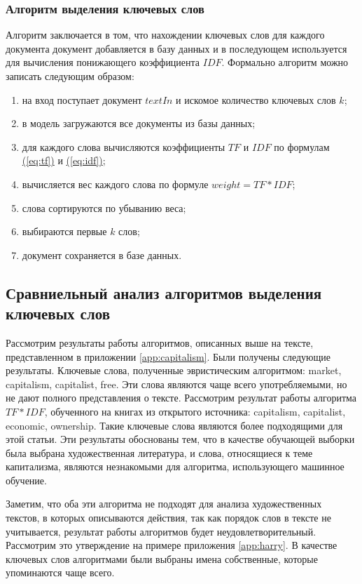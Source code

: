 \subsubsection{Алгоритм выделения ключевых слов}

Алгоритм заключается в том, что нахождении ключевых слов для каждого документа документ добавляется в базу данных и в последующем используется для вычисления понижающего коэффициента $IDF$. Формально алгоритм можно записать следующим образом:
\begin{enumerate}
\item на вход поступает документ $textIn$ и искомое количество ключевых слов $k$;
\item в модель загружаются все документы из базы данных;
\item для каждого слова вычисляются коэффициенты $TF$ и $IDF$ по формулам \hyperref[eq:tf]{(\ref{eq:tf})} и \hyperref[eq:idf]{(\ref{eq:idf})};
\item вычисляется вес каждого слова по формуле $weight = TF*IDF$;
\item слова сортируются по убыванию веса;
\item выбираются первые $k$ слов;
\item документ сохраняется в базе данных.
\end{enumerate}

\subsection{Сравниельный анализ алгоритмов выделения ключевых слов}

Рассмотрим результаты работы алгоритмов, описанных выше на тексте, представленном в приложении \hyperref[app:capitalism]{\ref{app:capitalism}}. Были получены следующие результаты. Ключевые слова, полученные эвристическим алгоритмом: market, capitalism, capitalist, free. Эти слова являются чаще всего употребляемыми, но не дают полного представления о тексте. Рассмотрим результат работы алгоритма $TF*IDF$, обученного на книгах из открытого источника: capitalism, capitalist, economic, ownership. Такие ключевые слова являются более подходящими для этой статьи. Эти результаты обоснованы тем, что в качестве обучающей выборки была выбрана художественная литература, и слова, относящиеся к теме капитализма, являются незнакомыми для алгоритма, использующего машинное обучение.

Заметим, что оба эти алгоритма не подходят для анализа художественных текстов, в которых описываются действия, так как порядок слов в тексте не учитывается, результат работы алгоритмов будет неудовлетворительный. Рассмотрим это утверждение на примере приложения \hyperref[app:harry]{\ref{app:harry}}. В качестве ключевых слов алгоритмами были выбраны имена собственные, которые упоминаются чаще всего.

